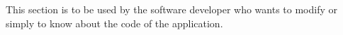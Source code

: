 %
%
%
%
%
%
%
%
%
%
This section is to be used by the software developer who wants to modify or
simply to know about the code of the application.
